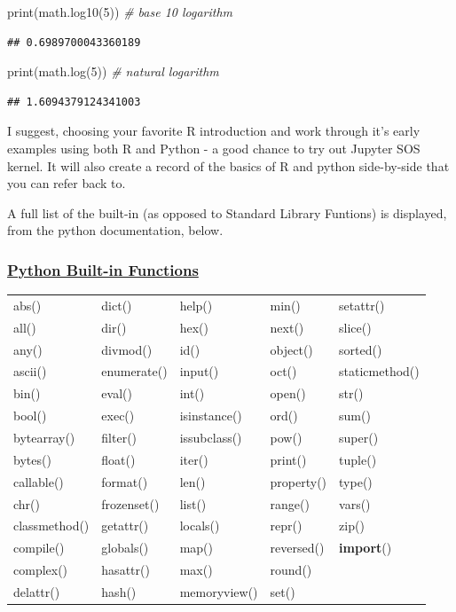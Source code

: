 \documentclass[]{book}
\newenvironment{Shaded}{\begin{snugshade}}{\end{snugshade}}
\newcommand{\DecValTok}[1]{\textcolor[rgb]{0.00,0.00,0.81}{#1}}
\newcommand{\CommentTok}[1]{\textcolor[rgb]{0.56,0.35,0.01}{\textit{#1}}}
\newcommand{\BuiltInTok}[1]{#1}
\newcommand{\NormalTok}[1]{#1}
\theoremstyle{definition}
\theoremstyle{definition}
\theoremstyle{definition}
\theoremstyle{remark}
\begin{document}
\begin{Shaded}
\begin{Highlighting}[]
\BuiltInTok{print}\NormalTok{(math.log10(}\DecValTok{5}\NormalTok{))            }\CommentTok{# base 10 logarithm}
\end{Highlighting}
\end{Shaded}

\begin{verbatim}
## 0.6989700043360189
\end{verbatim}

\begin{Shaded}
\begin{Highlighting}[]
\BuiltInTok{print}\NormalTok{(math.log(}\DecValTok{5}\NormalTok{))              }\CommentTok{# natural logarithm}
\end{Highlighting}
\end{Shaded}

\begin{verbatim}
## 1.6094379124341003
\end{verbatim}

I suggest, choosing your favorite R introduction and work through it's
early examples using both R and Python - a good chance to try out
Jupyter SOS kernel. It will also create a record of the basics of R and
python side-by-side that you can refer back to.

A full list of the built-in (as opposed to Standard Library Funtions) is
displayed, from the python documentation, below.

\subsubsection{\texorpdfstring{\href{https://docs.python.org/3.6/library/functions.html}{Python
Built-in
Functions}}{Python Built-in Functions}}\label{python-built-in-functions}

\begin{longtable}[]{@{}lllll@{}}
\toprule
abs() & dict() & help() & min() & setattr()\tabularnewline
all() & dir() & hex() & next() & slice()\tabularnewline
any() & divmod() & id() & object() & sorted()\tabularnewline
ascii() & enumerate() & input() & oct() & staticmethod()\tabularnewline
bin() & eval() & int() & open() & str()\tabularnewline
bool() & exec() & isinstance() & ord() & sum()\tabularnewline
bytearray() & filter() & issubclass() & pow() & super()\tabularnewline
bytes() & float() & iter() & print() & tuple()\tabularnewline
callable() & format() & len() & property() & type()\tabularnewline
chr() & frozenset() & list() & range() & vars()\tabularnewline
classmethod() & getattr() & locals() & repr() & zip()\tabularnewline
compile() & globals() & map() & reversed() &
\textbf{import}()\tabularnewline
complex() & hasattr() & max() & round() &\tabularnewline
delattr() & hash() & memoryview() & set() &\tabularnewline
\bottomrule
\end{longtable}
\end{document}
